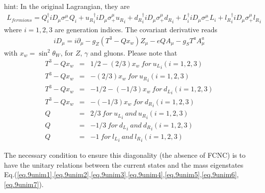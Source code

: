 \documentclass[12pt]{article}
\def\del{{\partial}}
\begin{document}
hint: In the original Lagrangian, they are
\begin{eqnarray}
  L_{fermions} =  Q_i^\dagger iD_\mu \sigma_-^\mu Q_i
  + {u_R}_i^\dagger iD_\mu \sigma_+^\mu {u_R}_i
  + {d_R}_i^\dagger iD_\mu \sigma_+^\mu {d_R}_i
  +  L_i^\dagger iD_\mu \sigma_-^\mu L_i
  + {l_R}_i^\dagger iD_\mu \sigma_+^\mu {l_R}_i
\end{eqnarray}
  where $i=1,2,3$ are generation indices. The covariant derivative 
reads
\begin{eqnarray}
  iD_\mu = i\del_\mu -g_Z (T^3-Qx_w) Z_\mu -e Q A_\mu -g_S T^a A^a_\mu
\end{eqnarray}
  with $x_w=\sin^2\theta_W$, for $Z$, $\gamma$ and gluons. Please note that
\begin{eqnarray}
  T^3-Qx_w &=&  1/2-( 2/3)x_w ~for~ {u_L}_i (i=1,2,3) \\
  T^3-Qx_w &=&     -( 2/3)x_w ~for~{u_R}_i (i=1,2,3) \\
  T^3-Qx_w &=& -1/2-(-1/3)x_w ~for~ {d_L}_i (i=1,2,3) \\
  T^3-Qx_w &=&     -(-1/3)x_w ~for~ {d_R}_i (i=1,2,3) \\
  Q &=&  2/3 ~for~ {u_L}_i ~and~ {u_R}_i (i=1,2,3) \\
  Q &=& -1/3 ~for~ {d_L}_i ~and~ {d_R}_i (i=1,2,3) \\
  Q &=& -1   ~for~ {l_L}_i ~and~ {l_R}_i (i=1,2,3)
\end{eqnarray}

  The necessary condition to ensure this diagonality (the absence of 
FCNC) is to have the unitary relations between the current states and the
  mass eigenstates Eq.(\ref{eq.9unim1},\ref{eq.9unim2},\ref{eq.9unim3},\ref{eq.9unim4},\ref{eq.9unim5},\ref{eq.9unim6},\ref{eq.9unim7}).
\end{document}
